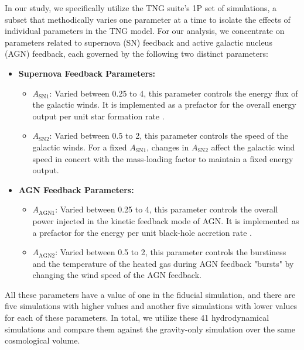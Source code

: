 In our study, we specifically utilize the TNG suite's 1P set of simulations, a subset that methodically varies one parameter at a time to isolate the effects of individual parameters in the TNG model. For our analysis, we concentrate on parameters related to supernova (SN) feedback and active galactic nucleus (AGN) feedback, each governed by the following two distinct parameters:

\begin{itemize}
    \item \textbf{Supernova Feedback Parameters:}
    \begin{itemize}
        \item $A_{\mathrm{SN1}}$: Varied between 0.25 to 4, this parameter controls the energy flux of the galactic winds. It is implemented as a prefactor for the overall energy output per unit star formation rate \cite{2018MNRAS.473.4077P,CAMELS_presentation}.
        \item $A_{\mathrm{SN2}}$: Varied between 0.5 to 2, this parameter controls the speed of the galactic winds. For a fixed $A_{\mathrm{SN1}}$, changes in $A_{\mathrm{SN2}}$ affect the galactic wind speed in concert with the mass-loading factor to maintain a fixed energy output.
    \end{itemize}
    \item \textbf{AGN Feedback Parameters:}
    \begin{itemize}
        \item $A_{\mathrm{AGN1}}$: Varied between 0.25 to 4, this parameter controls the overall power injected in the kinetic feedback mode of AGN. It is implemented as a prefactor for the energy per unit black-hole accretion rate \cite{2017MNRAS.465.3291W,CAMELS_presentation}.
        \item $A_{\mathrm{AGN2}}$: Varied between 0.5 to 2, this parameter controls the burstiness and the temperature of the heated gas during AGN feedback "bursts" by changing the wind speed of the AGN feedback.
    \end{itemize}
\end{itemize}
% 
All these parameters have a value of one in the fiducial simulation, and there are five simulations with higher values and another five simulations with lower values for each of these parameters. In total, we utilize these 41 hydrodynamical simulations and compare them against the gravity-only simulation over the same cosmological volume.



